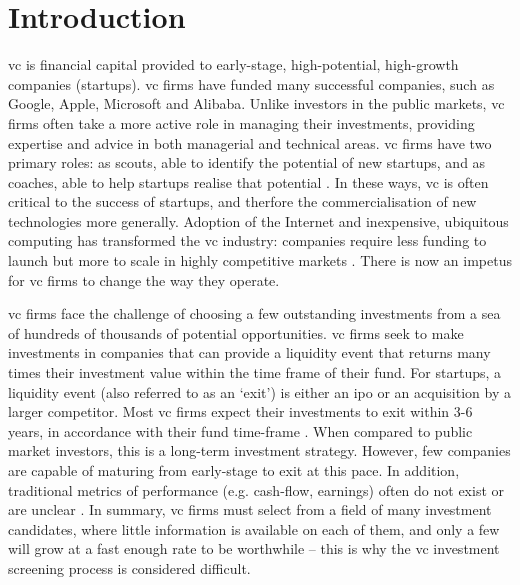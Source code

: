 \documentclass[../thesis/thesis.tex]{subfiles}
\begin{document}
\chapter{Introduction}
\label{chap:introduction}

\Gls{vc} is financial capital provided to early-stage, high-potential, high-growth companies (startups). \Gls{vc} firms have funded many successful companies, such as Google, Apple, Microsoft and Alibaba. Unlike investors in the public markets, \gls{vc} firms often take a more active role in managing their investments, providing expertise and advice in both managerial and technical areas. \Gls{vc} firms have two primary roles: as scouts, able to identify the potential of new startups, and as coaches, able to help startups realise that potential \cite{baum2004}. In these ways, \gls{vc} is often critical to the success of startups, and therfore the commercialisation of new technologies more generally. Adoption of the Internet and inexpensive, ubiquitous computing has transformed the \gls{vc} industry: companies require less funding to launch but more to scale in highly competitive markets \cite{graham2013}. There is now an impetus for \gls{vc} firms to change the way they operate.

\Gls{vc} firms face the challenge of choosing a few outstanding investments from a sea of hundreds of thousands of potential opportunities. \Gls{vc} firms seek to make investments in companies that can provide a liquidity event that returns many times their investment value within the time frame of their fund. For startups, a liquidity event (also referred to as an `exit') is either an \gls{ipo} or an acquisition by a larger competitor. Most \gls{vc} firms expect their investments to exit within 3-6 years, in accordance with their fund time-frame \cite{gompers1995}. When compared to public market investors, this is a long-term investment strategy. However, few companies are capable of maturing from early-stage to exit at this pace. In addition, traditional metrics of performance (e.g. cash-flow, earnings) often do not exist or are unclear \cite{shane2002}. In summary, \gls{vc} firms must select from a field of many investment candidates, where little information is available on each of them, and only a few will grow at a fast enough rate to be worthwhile  -- this is why the \gls{vc} investment screening process is considered difficult.
\end{document}
